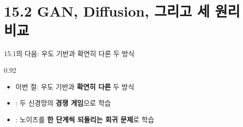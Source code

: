 \section{15.2 GAN, Diffusion, 그리고 세 원리 비교}
\begin{frame}{15.1의 다음: 우도 기반과 확연히 다른 두 방식}
\begin{center}\begin{varwidth}{0.92\textwidth}
  \begin{itemize}
    
    \item 이번 절: 우도 기반과 \textbf{확연히 다른} 두 방식
    \item {}: 두 신경망의 \textbf{경쟁 게임}으로 학습
    \item {}: 노이즈를 \textbf{한 단계씩 되돌리는
      회귀 문제}로 학습
    
  \end{itemize}
\end{varwidth}\end{center}
\end{frame}
